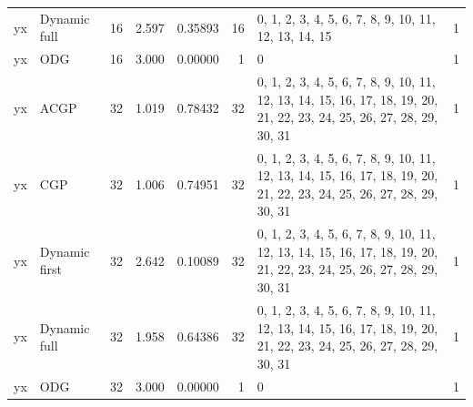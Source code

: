 \documentclass[10pt,a4paper]{article}
\begin{document}
\begin{longtable}{@{}p{23mm}p{29mm}rrrrp{36mm}r@{}}
yx & Dynamic full & 16 & 2.597 & 0.35893 & 16 & 0, 1, 2, 3, 4, 5, 6, 7, 8, 9, 10, 11, 12, 13, 14, 15 & 1 \\
yx & ODG & 16 & 3.000 & 0.00000 & 1 & 0 & 1 \\
yx & ACGP & 32 & 1.019 & 0.78432 & 32 & 0, 1, 2, 3, 4, 5, 6, 7, 8, 9, 10, 11, 12, 13, 14, 15, 16, 17, 18, 19, 20, 21, 22, 23, 24, 25, 26, 27, 28, 29, 30, 31 & 1 \\
yx & CGP & 32 & 1.006 & 0.74951 & 32 & 0, 1, 2, 3, 4, 5, 6, 7, 8, 9, 10, 11, 12, 13, 14, 15, 16, 17, 18, 19, 20, 21, 22, 23, 24, 25, 26, 27, 28, 29, 30, 31 & 1 \\
yx & Dynamic first & 32 & 2.642 & 0.10089 & 32 & 0, 1, 2, 3, 4, 5, 6, 7, 8, 9, 10, 11, 12, 13, 14, 15, 16, 17, 18, 19, 20, 21, 22, 23, 24, 25, 26, 27, 28, 29, 30, 31 & 1 \\
yx & Dynamic full & 32 & 1.958 & 0.64386 & 32 & 0, 1, 2, 3, 4, 5, 6, 7, 8, 9, 10, 11, 12, 13, 14, 15, 16, 17, 18, 19, 20, 21, 22, 23, 24, 25, 26, 27, 28, 29, 30, 31 & 1 \\
yx & ODG & 32 & 3.000 & 0.00000 & 1 & 0 & 1 \\
\end{longtable}\normalsize\setlength{\tabcolsep}{6pt}
\clearpage
\end{document}
